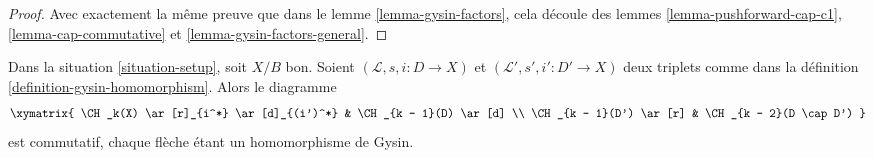 \begin{proof}
Avec exactement la même preuve que dans le lemme \ref{lemma-gysin-factors},
cela découle des lemmes \ref{lemma-pushforward-cap-c1},
\ref{lemma-cap-commutative} et \ref{lemma-gysin-factors-general}.
\end{proof}

\begin{lemma}
\label{lemma-gysin-commutes-gysin}
Dans la situation \ref{situation-setup}, soit $X/B$ bon. Soient
$(\mathcal{L}, s, i : D \to X)$ et $(\mathcal{L}', s', i' : D' \to X)$ deux
triplets comme dans la définition \ref{definition-gysin-homomorphism}. Alors le
diagramme
$$
\xymatrix{
\CH_k(X) \ar[r]_{i^*} \ar[d]_{(i')^*} & \CH_{k - 1}(D) \ar[d] \\
\CH_{k - 1}(D') \ar[r] & \CH_{k - 2}(D \cap D')
}
$$
est commutatif, chaque flèche étant un homomorphisme de Gysin.
\end{lemma}

